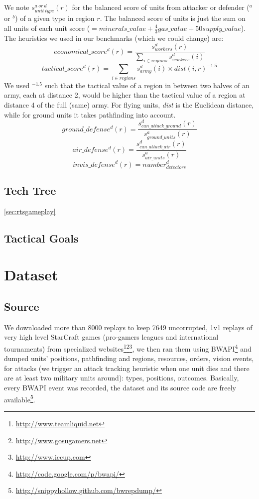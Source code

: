We note $s^{a\ or\ d}_{unit\ type}(r)$ for the balanced score of units from attacker or defender ($^{a}$ or $^{b}$) of a given type in region $r$. The balanced score of units is just the sum on all units of each unit score ($= minerals\_value + \frac{4}{3}gas\_value + 50supply\_value$). The heuristics we used in our benchmarks (which we could change) are: 
$$economical\_score^d(r) = \frac{s^d_{workers}(r)}{\sum_{i \in regions} s^d_{workers}(i)}$$
$$tactical\_score^d(r) = \sum_{i \in regions} s^d_{army}(i) \times dist(i,r)^{-1.5}$$
We used $^{-1.5}$ such that the tactical value of a region in between two halves of an army, each at distance 2, would be higher than the tactical value of a region at distance 4 of the full (same) army. For flying units, \textit{dist} is the Euclidean distance, while for ground units it takes pathfinding into account.
$$ground\_defense^d(r) = \frac{s^d_{can\_attack\_ground}(r)}{s^a_{ground\_units}(r)}$$
$$air\_defense^d(r) = \frac{s^d_{can\_attack\_air}(r)}{s^a_{air\_units}(r)}$$
$$invis\_defense^d(r) = number^d_{detectors}$$

\subsection{Tech Tree}
\ref{sec:rtsgameplay}

\subsection{Tactical Goals}

\section{Dataset}
\subsection{Source}
We downloaded more than 8000 replays to keep 7649 uncorrupted, 1v1 replays of very high level StarCraft games (pro-gamers leagues and international tournaments) from specialized websites\footnote{\url{http://www.teamliquid.net}}\footnote{\url{http://www.gosugamers.net}}\footnote{\url{http://www.iccup.com}}, we then ran them using BWAPI\footnote{\url{http://code.google.com/p/bwapi/}} and dumped units' positions, pathfinding and regions, resources, orders, vision events, for attacks (we trigger an attack tracking heuristic when one unit dies and there are at least two military units around): types, positions, outcomes. Basically, every BWAPI event was recorded, the dataset and its source code are freely available\footnote{\url{http://snippyhollow.github.com/bwrepdump/}}. 
